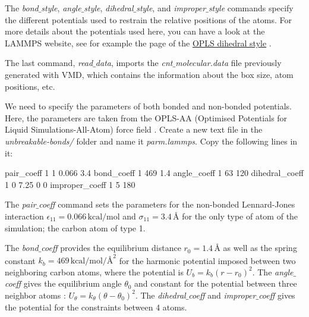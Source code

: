 \vspace{0.25cm} \noindent The \textit{bond$\_$style}, \textit{angle$\_$style}, \textit{dihedral$\_$style}, and \textit{improper$\_$style} commands specify the
different potentials used to restrain the relative positions of the
atoms. For more details about the potentials used here, you can have a look
at the LAMMPS website, see for example
the page of the \href{https://lammps.sandia.gov/doc/dihedral_opls.html}{OPLS dihedral style} \cite{jorgensen1988opls}.

\vspace{0.25cm} \noindent The last command, \textit{read$\_$data}, imports the \textit{cnt$\_$molecular.data} file
previously generated with VMD, which contains the
information about the box size, atom positions, etc.

\begin{tcolorbox}[colback=mylightblue!5!white,colframe=mylightblue!75!black,title=About interaction between neighbors atoms]

\end{tcolorbox}

\noindent We need to specify the parameters of both bonded and
non-bonded potentials. Here, the parameters are taken from the OPLS-AA
(Optimised Potentials for Liquid Simulations-All-Atom) force 
field \cite{jorgensenDevelopmentTestingOPLS1996}.
Create a new text file in the \textit{unbreakable-bonds/}
folder and name it \textit{parm.lammps}. Copy the following lines in it:

\begin{lcverbatim}
pair_coeff 1 1 0.066 3.4
bond_coeff 1 469 1.4
angle_coeff 1 63 120
dihedral_coeff 1 0 7.25 0 0
improper_coeff 1 5 180
\end{lcverbatim}

\noindent The \textit{pair$\_$coeff} command sets the parameters for the non-bonded Lennard-Jones
interaction $\epsilon_{11} = 0.066 \, \text{kcal/mol}$
and $\sigma_{11} = 3.4 \, \text{Å}$ for the only type of atom of the
simulation; the carbon atom of type 1. 

\vspace{0.25cm} \noindent The \textit{bond$\_$coeff} provides the equilibrium distance $r_0= 1.4 \, \text{Å}$ as
well as the spring constant $k_b = 469 \, \text{kcal/mol/Å}^2$ for the harmonic
potential imposed between two neighboring carbon atoms,
where the potential is $U_b = k_b ( r - r_0)^2$. The
\textit{angle$\_$coeff} gives the equilibrium angle $\theta_0$ and
constant for the potential between three neighbor atoms :
$U_\theta = k_\theta ( \theta - \theta_0)^2$. The \textit{dihedral$\_$coeff}
and \textit{improper$\_$coeff} gives the potential for the constraints
between 4 atoms. 

